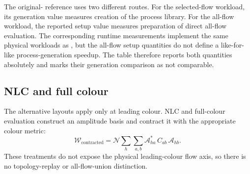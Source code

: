 The original-\AC{} reference uses two different routes. For the selected-flow
workload, its generation value measures creation of the process library. For
the all-flow workload, the reported setup value measures preparation of direct
all-flow evaluation. The corresponding runtime measurements implement the
same physical workloads as \PAC{}, but the all-flow setup quantities do not
define a like-for-like process-generation speedup. The table therefore reports
both quantities absolutely and marks their generation comparison as not
comparable.

\subsection{NLC and full colour}

The alternative layouts apply only at leading colour.  NLC and full-colour
evaluation construct an amplitude basis and contract it with the appropriate
colour metric:
\begin{equation}
  \mathcal W_{\mathrm{contracted}}
  =\mathcal N\sum_h\sum_{a,b}
   \mathcal A_{ha}^{*}\,C_{ab}\,\mathcal A_{hb}.
  \label{eq:contracted-colour-layout}
\end{equation}
These treatments do not expose the physical leading-colour flow axis, so there
is no topology-replay or all-flow-union distinction.
